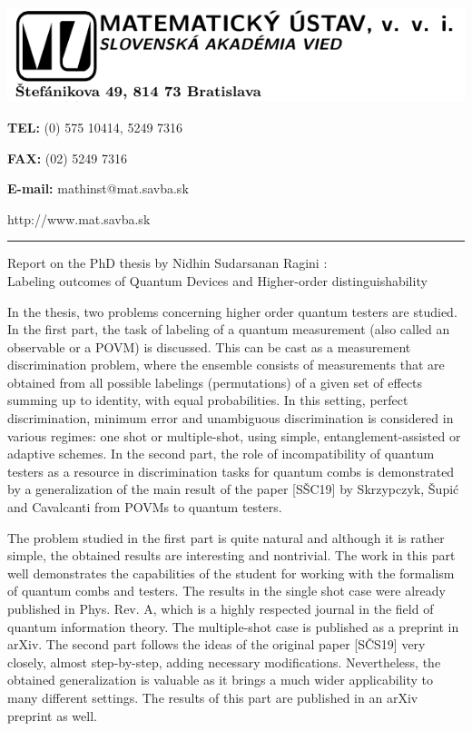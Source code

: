 \documentclass{article}
\begin{document}
\begin{minipage}{0.7\linewidth}
\vspace{0pt}\includegraphics{hlava.pdf}
\end{minipage}%
\begin{minipage}{0.4\linewidth}
\textbf{TEL:} (0) 575 10414, 5249 7316

\textbf{FAX:} (02) 5249 7316

\textbf{E-mail:} mathinst@mat.savba.sk

http://www.mat.savba.sk
\end{minipage}

\vskip 3mm

\rule{\textwidth}{0.4pt}

\medskip 
\begin{center}
{\large Report on the PhD thesis by Nidhin Sudarsanan Ragini
: \\  Labeling outcomes of Quantum Devices and Higher-order distinguishability     
 }

\end{center}
\medskip

\bigskip

\bigskip

In the thesis, two problems concerning higher order quantum testers are studied. In the
first part, the task of labeling of a quantum measurement (also called an observable or a  POVM) is discussed. This can be
cast as a measurement discrimination problem, where the ensemble consists of measurements that
are obtained from all possible labelings (permutations) of a given set of effects summing up to identity, with equal
probabilities. In this setting, perfect discrimination, minimum error and unambiguous
discrimination is considered in various regimes: one shot or multiple-shot, using simple,
entanglement-assisted or adaptive schemes. In the second part, the role of incompatibility
of quantum testers as a resource in discrimination tasks for quantum combs is demonstrated
by a generalization of the main result of the paper
[S\v SC19] by Skrzypczyk, \v Supi\'c and Cavalcanti from POVMs to quantum testers. 

The problem studied in the first part is quite natural and although it is rather simple,
the obtained results are interesting and nontrivial. The work in this part well
demonstrates the capabilities of the student for working with the formalism of quantum combs and testers. 
The results in the single
shot case were already published  in Phys. Rev. A, which is a highly respected journal in
the field of quantum information theory. The multiple-shot case is published as a preprint in
arXiv. The second part follows the ideas of the original paper [S\v CS19] very closely,
almost step-by-step, adding necessary modifications. Nevertheless, the obtained
generalization is valuable as it brings a much wider applicability to many different
settings. The results of this part are published in an arXiv preprint as well. 
\end{document}
